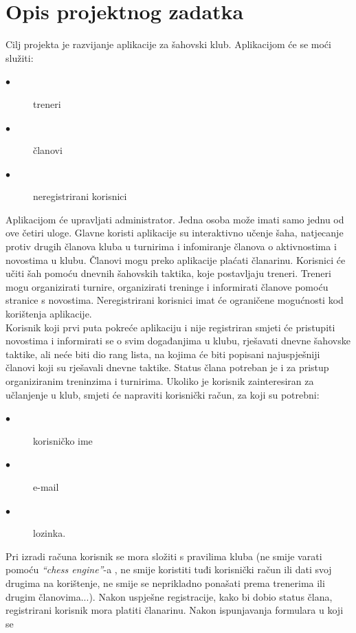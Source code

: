 \chapter{Opis projektnog zadatka}
		
		 \noindent   Cilj projekta je razvijanje aplikacije za šahovski klub. Aplikacijom će
			se moći služiti:
			
			\begin{description}
				\item[$\bullet$] treneri 
				\item[$\bullet$] članovi
				\item[$\bullet$] neregistrirani korisnici
			\end{description} 
		    Aplikacijom će upravljati administrator. Jedna osoba može imati samo jednu od ove
			četiri uloge. Glavne koristi aplikacije su interaktivno učenje šaha,
			natjecanje protiv drugih članova kluba u turnirima i infomiranje članova
			o aktivnostima i novostima u klubu. Članovi mogu preko aplikacije plaćati članarinu. Korisnici će učiti šah pomoću dnevnih šahovskih
			taktika, koje postavljaju treneri. Treneri mogu organizirati turnire,
			organizirati treninge i informirati članove pomoću stranice s novostima.
			Neregistrirani korisnici imat će ograničene mogućnosti kod korištenja
			aplikacije. \\
		    Korisnik koji prvi puta pokreće aplikaciju i nije registriran smjeti će
			pristupiti novostima i informirati se o svim događanjima u klubu,
			rješavati dnevne šahovske taktike, ali neće biti dio rang lista, na
			kojima će biti popisani najuspješniji članovi koji su rješavali dnevne
			taktike. Status člana potreban je i za pristup organiziranim treninzima
			i turnirima. Ukoliko je korisnik zainteresiran za učlanjenje u klub,
			smjeti će napraviti korisnički račun, za koji su potrebni:
			\begin{description}
			\item[$\bullet$] korisničko ime
			\item[$\bullet$] e-mail
			\item[$\bullet$] lozinka. 
	    	\end{description} 
			Pri izradi računa korisnik se mora složiti s
			pravilima kluba (ne smije varati pomoću \textit{``chess engine''}-a , ne smije
			koristiti tuđi korisnički račun ili dati svoj drugima na korištenje, ne
			smije se neprikladno ponašati prema trenerima ili drugim članovima...).
			Nakon uspješne registracije, kako bi dobio status člana, registrirani
			korisnik mora platiti članarinu. Nakon ispunjavanja formulara u koji se
